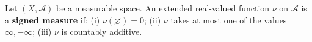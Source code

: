 Let $(X, \mathcal{A})$ be a measurable space. An extended real-valued function $\nu$ on $\mathcal{A}$ is a \textbf{signed measure} if: (i) $\nu(\varnothing) = 0$; (ii) $\nu$ takes at most one of the values $\infty, -\infty$; (iii) $\nu$ is countably additive.
